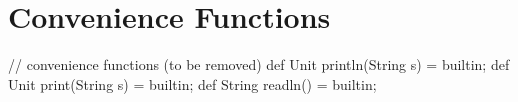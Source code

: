 \section{Convenience Functions}

\begin{abscode}
// convenience functions (to be removed)
def Unit println(String s) = builtin;
def Unit print(String s) = builtin;
def String readln() = builtin;
\end{abscode}


